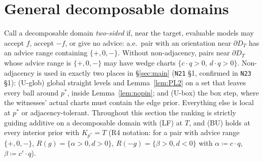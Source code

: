 \documentclass[11pt]{article}
\theoremstyle{definition}
\theoremstyle{remark}
\newcommand{\src}[1]{\texttt{#1}}
\begin{document}
\section{General decomposable domains}\label{sec:general}

Call a decomposable domain \emph{two-sided} if, near the target, evaluable models may accept $f$, accept $-f$, or give no advice: a.e.\ pair with an orientation near $\partial D_T$ has an advice range containing $\{+,0,-\}$. Without non-adjacency, pairs near $\partial D_T$ whose advice range is $\{+,0,-\}$ may have wedge charts $\{c\cdot q>0,\,d\cdot q>0\}$. Non-adjacency is used in exactly two places in \S\ref{sec:main} (\src{N21} \S1, confirmed in \src{N23} \S1): (U-glob) global straight levels and Lemma~\ref{lem:PL2} on a set that leaves every ball around $p^*$, inside Lemma~\ref{lem:nopin}; and (U-box) the box step, where the witnesses' actual charts must contain the edge prior. Everything else is local at $p^*$ or adjacency-tolerant. Throughout this section the ranking is strictly guiding additive on a decomposable domain with (LF) at $T$, and (BU) holds at every interior prior with $K_{p^*}=T$ (R4 notation: for a pair with advice range $\{+,0,-\}$, $R(g)=\{\alpha>0,d>0\}$, $R(-g)=\{\beta>0,d<0\}$ with $\alpha\coloneqq c\cdot q$, $\beta\coloneqq c'\cdot q$).
\end{document}
